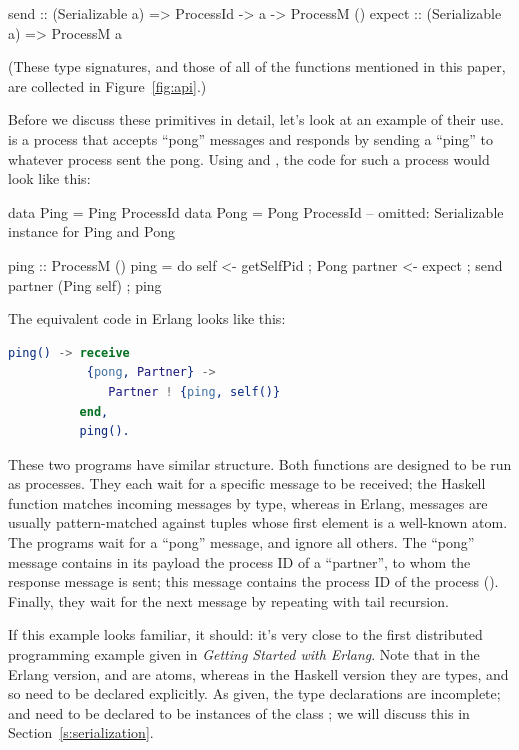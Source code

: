 \documentclass[preprint]{sigplanconf}
\begin{document}
\par{\small
\begin{code}
send :: (Serializable a) => ProcessId -> a 
						-> ProcessM ()
expect :: (Serializable a) => ProcessM a
\end{code}}
\noindent
(These type signatures, and those of all of the functions mentioned in this paper, are collected in Figure~\ref{fig:api}.)

Before we discuss these primitives in detail, let's look at an example of their use.
 is a process that accepts ``pong'' messages and responds by sending a ``ping'' to whatever process sent the pong. Using  and , the code for such a process would look like this:

\begin{code}
data Ping = Ping ProcessId
data Pong = Pong ProcessId
-- omitted: Serializable instance for Ping and Pong

ping :: ProcessM ()
ping = do { self <- getSelfPid
          ; Pong partner <- expect
          ; send partner (Ping self)
          ; ping }
\end{code}

\noindent The equivalent code in Erlang looks like this:

\begin{lstlisting}[language=Erlang]
ping() -> receive
           {pong, Partner} -> 
              Partner ! {ping, self()}
          end,
          ping().               
\end{lstlisting}

These two programs have similar structure. Both  functions are designed to be run as processes. They each wait for a specific message to be received; the Haskell  function matches incoming messages by type, whereas in Erlang, messages are usually pattern-matched against tuples whose first element is a well-known atom. The programs wait for a ``pong'' message, and ignore all others. The ``pong'' message contains in its payload the process ID of a ``partner'', to whom the response message is sent; this message contains the process ID of the  process (). Finally, they wait for the next message by repeating with tail recursion.

If this example looks familiar, it should: it's very close to the first distributed programming example given in {\em Getting Started with Erlang}\cite{GSWE}. Note that in the Erlang version,  and  are atoms, whereas in the Haskell version they are types, and so need to be declared explicitly. 
As given, the type declarations are incomplete;  and  need to be declared to be instances of the class ; we will discuss this in Section~\ref{s:serialization}.
\end{document}
